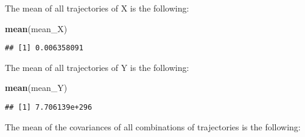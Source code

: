 \documentclass[]{article}
\newenvironment{Shaded}{\begin{snugshade}}{\end{snugshade}}
\newcommand{\ControlFlowTok}[1]{\textcolor[rgb]{0.13,0.29,0.53}{\textbf{#1}}}
\newcommand{\DecValTok}[1]{\textcolor[rgb]{0.00,0.00,0.81}{#1}}
\newcommand{\KeywordTok}[1]{\textcolor[rgb]{0.13,0.29,0.53}{\textbf{#1}}}
\newcommand{\NormalTok}[1]{#1}
\newcommand{\OperatorTok}[1]{\textcolor[rgb]{0.81,0.36,0.00}{\textbf{#1}}}
\newcommand{\StringTok}[1]{\textcolor[rgb]{0.31,0.60,0.02}{#1}}
\begin{document}
The mean of all trajectories of X is the following:

\begin{Shaded}
\begin{Highlighting}[]
\KeywordTok{mean}\NormalTok{(mean_X)}
\end{Highlighting}
\end{Shaded}

\begin{verbatim}
## [1] 0.006358091
\end{verbatim}

The mean of all trajectories of Y is the following:

\begin{Shaded}
\begin{Highlighting}[]
\KeywordTok{mean}\NormalTok{(mean_Y)}
\end{Highlighting}
\end{Shaded}

\begin{verbatim}
## [1] 7.706139e+296
\end{verbatim}

The mean of the covariances of all combinations of trajectories is the
following:

\begin{Shaded}
\end{Shaded}
\end{document}
